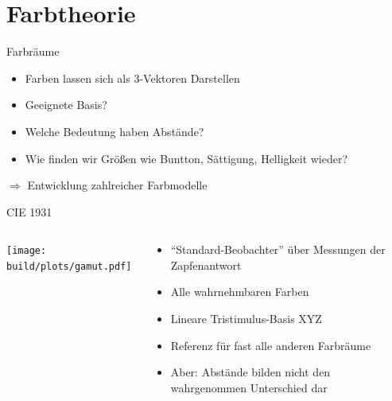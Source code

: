\documentclass[aspectratio=1610, 9pt]{beamer}
\begin{document}
\section{Farbtheorie}

\begin{frame}{Farbräume}
  \begin{itemize}
    \item Farben lassen sich als 3-Vektoren Darstellen
    \item Geeignete Basis?
    \item Welche Bedeutung haben Abstände?
    \item Wie finden wir Größen wie Buntton, Sättigung, Helligkeit wieder?
  \end{itemize}

  \Large $⇒{}$ Entwicklung zahlreicher Farbmodelle
\end{frame}%

\begin{frame}{CIE 1931}
  \begin{columns}[onlytextwidth]%
    \begin{column}{0.495\textwidth}%
      \texttt{[image: build/plots/gamut.pdf]}
    \end{column}%
    \begin{column}{0.495\textwidth}%
      \begin{itemize}
        \item \enquote{Standard-Beobachter} über Messungen der Zapfenantwort
        \item Alle wahrnehmbaren Farben
        \item Lineare Tristimulus-Basis XYZ
        \item Referenz für fast alle anderen Farbräume
        \item Aber: Abstände bilden nicht den wahrgenommen Unterschied dar
      \end{itemize}
    \end{column}%
  \end{columns}%
\end{frame}
\end{document}
